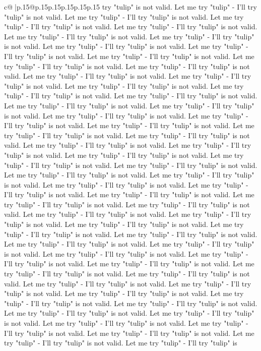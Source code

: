 \documentclass{article}
\begin{document}
{\begin{supertabular}{c@{$\;$}|p{.15\linewidth}@{}p{.15\linewidth}p{.15\linewidth}p{.15\linewidth}p{.15\linewidth}p{.15\linewidth}}
{{{try "tulip" is not valid. Let me try "tulip" {-} I'll try "tulip" is not valid. Let me try "tulip" {-} I'll try "tulip" is not valid. Let me try "tulip" {-} I'll try "tulip" is not valid. Let me try "tulip" {-} I'll try "tulip" is not valid. Let me try "tulip" {-} I'll try "tulip" is not valid. Let me try "tulip" {-} I'll try "tulip" is not valid. Let me try "tulip" {-} I'll try "tulip" is not valid. Let me try "tulip" {-} I'll try "tulip" is not valid. Let me try "tulip" {-} I'll try "tulip" is not valid. Let me try "tulip" {-} I'll try "tulip" is not valid. Let me try "tulip" {-} I'll try "tulip" is not valid. Let me try "tulip" {-} I'll try "tulip" is not valid. Let me try "tulip" {-} I'll try "tulip" is not valid. Let me try "tulip" {-} I'll try "tulip" is not valid. Let me try "tulip" {-} I'll try "tulip" is not valid. Let me try "tulip" {-} I'll try "tulip" is not valid. Let me try "tulip" {-} I'll try "tulip" is not valid. Let me try "tulip" {-} I'll try "tulip" is not valid. Let me try "tulip" {-} I'll try "tulip" is not valid. Let me try "tulip" {-} I'll try "tulip" is not valid. Let me try "tulip" {-} I'll try "tulip" is not valid. Let me try "tulip" {-} I'll try "tulip" is not valid. Let me try "tulip" {-} I'll try "tulip" is not valid. Let me try "tulip" {-} I'll try "tulip" is not valid. Let me try "tulip" {-} I'll try "tulip" is not valid. Let me try "tulip" {-} I'll try "tulip" is not valid. Let me try "tulip" {-} I'll try "tulip" is not valid. Let me try "tulip" {-} I'll try "tulip" is not valid. Let me try "tulip" {-} I'll try "tulip" is not valid. Let me try "tulip" {-} I'll try "tulip" is not valid. Let me try "tulip" {-} I'll try "tulip" is not valid. Let me try "tulip" {-} I'll try "tulip" is not valid. Let me try "tulip" {-} I'll try "tulip" is not valid. Let me try "tulip" {-} I'll try "tulip" is not valid. Let me try "tulip" {-} I'll try "tulip" is not valid. Let me try "tulip" {-} I'll try "tulip" is not valid. Let me try "tulip" {-} I'll try "tulip" is not valid. Let me try "tulip" {-} I'll try "tulip" is not valid. Let me try "tulip" {-} I'll try "tulip" is not valid. Let me try "tulip" {-} I'll try "tulip" is not valid. Let me try "tulip" {-} I'll try "tulip" is not valid. Let me try "tulip" {-} I'll try "tulip" is not valid. Let me try "tulip" {-} I'll try "tulip" is not valid. Let me try "tulip" {-} I'll try "tulip" is not valid. Let me try "tulip" {-} I'll try "tulip" is not valid. Let me try "tulip" {-} I'll try "tulip" is not valid. Let me try "tulip" {-} I'll try "tulip" is not valid. Let me try "tulip" {-} I'll try "tulip" is not valid. Let me try "tulip" {-} I'll try "tulip" is not valid. Let me try "tulip" {-} I'll try "tulip" is not valid. Let me try "tulip" {-} I'll try "tulip" is not valid. Let me try "tulip" {-} I'll try "tulip" is not valid. Let me try "tulip" {-} I'll try "tulip" is not valid. Let me try "tulip" {-} I'll try "tulip" is not valid. Let me try "tulip" {-} I'll try "tulip" is not valid. Let me try "tulip" {-} I'll try "tulip" is not valid. Let me try "tulip" {-} I'll try "tulip" is not valid. Let me try "tulip" {-} I'll try "tulip" is not valid. Let me try "tulip" {-} I'll try "tulip" is }}}
\end{supertabular}}
\end{document}

